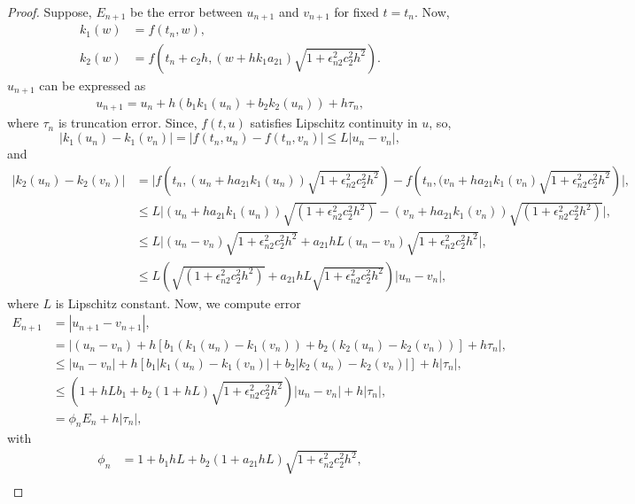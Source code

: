 \documentclass[a4paper, preprint,11pt]{elsarticle}
\numberwithin{equation}{section}
\begin{document}
\begin{proof}
Suppose, $E_{n+1}$ be the error between $u_{n+1}$ and $v_{n+1}$ for fixed $t = t_n$. Now,
\begin{align*}
k_1(w) &= f(t_n, w), \\
k_2(w) &= f \left(t_n + c_2h, (w + hk_1a_{21})\sqrt{1 + \epsilon_{n2}^2 c_{2}^2 h^2} \right).
\end{align*}
$u_{n+1}$ can be expressed as 
\begin{align*}
 u_{n+1} = u_n + h (b_1k_1(u_n) + b_2k_2(u_n)) + h \tau_n,
\end{align*}
where $\tau_n$ is truncation error.
Since, $f(t, u)$ satisfies Lipschitz continuity in $u$, so,
\begin{equation*}
|k_1(u_n)- k_1(v_n)| = |f(t_n, u_n)-f(t_n, v_n)| \leq L|u_n - v_n|,
\end{equation*}
and 
\begin{align*}
    |k_2(u_n)- k_2(v_n)| & = \biggl|f\left(t_n,(u_n + ha_{21}k_1(u_n)) \sqrt{1 + \epsilon_{n2}^2 c_{2}^2 h^2}
\right)-f\left(t_n,(v_n + ha_{21}k_1(v_n) \sqrt{1 + \epsilon_{n2}^2 c_{2}^2 h^2}\right)\biggl|, \\
    & \leq L\biggl|\left(u_n +ha_{21}k_1(u_n)\right)\sqrt{(1 + \epsilon_{n2}^2 c_{2}^2 h^2)}  - \left(v_n + ha_{21}k_1(v_n)\right)\sqrt{(1 + \epsilon_{n2}^2 c_{2}^2 h^2)}\biggl|, \\
    & \leq L\biggl|(u_n - v_n)\sqrt{1 +\epsilon_{n2}^2 c_{2}^2 h^2} + a_{21}hL(u_n -v_n)\sqrt{1 + \epsilon_{n2}^2c_2^2h^2}\biggl|, \\
   &  \leq L\left(\sqrt{(1 + \epsilon_{n2}^2 c_{2}^2 h^2)} + a_{21}hL \sqrt{1 + \epsilon_{n2}^2c_2^2h^2}\right)|u_n - v_n |,
\end{align*}
where $L$ is Lipschitz constant. Now, we compute error
\begin{align*}
    E_{n+1} & = |u_{n+1} - v_{n+1}|, \\
& = |(u_n - v_n) + h [ b_1(k_1(u_n) - k_1(v_n)) + b_2(k_2(u_n) - k_2(v_n))] + h\tau_n|, \\
& \leq |u_n -v_n| + h [b_1|k_1(u_n) - k_1(v_n)| + b_2|k_2(u_n)- k_2(v_n)|] + h|\tau_n|, \\
& \leq \left(1 + hLb_1 + b_2(1 + hL)\sqrt{1 + \epsilon_{n2}^2c_2^2h^2}\right)|u_n -v_n| + h|\tau_n|, \\
& = \phi_n E_n + h|\tau_n|,
\end{align*}
with
\begin{align*}
    \phi_n & = 1 + b_1hL + b_2 (1 + a_{21}hL)  \sqrt{1 + \epsilon_{n2}^2 c_{2}^2 h^2},  \\

\end{align*}
\end{proof}
\end{document}
